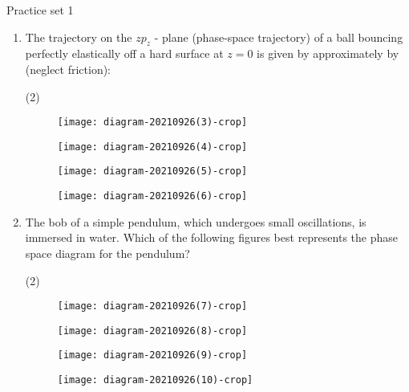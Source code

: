 \newpage
\begin{abox}
	Practice set 1 
\end{abox}
\begin{enumerate}
	\item The trajectory on the $z p_{z}$ - plane (phase-space trajectory) of a ball bouncing perfectly elastically off a hard surface at $z=0$ is given by approximately by (neglect friction):
	{}
	\begin{tasks}(2)
		\task[\textbf{A.}]\begin{figure}[H]
			\centering
			\texttt{[image: diagram-20210926(3)-crop]}
		\end{figure}
		\task[\textbf{B.}]\begin{figure}[H]
			\centering
			\texttt{[image: diagram-20210926(4)-crop]}
		\end{figure}
		\task[\textbf{C.}]\begin{figure}[H]
			\centering
			\texttt{[image: diagram-20210926(5)-crop]}
		\end{figure}
		\task[\textbf{D.}]\begin{figure}[H]
			\centering
			\texttt{[image: diagram-20210926(6)-crop]}
		\end{figure}
	\end{tasks}
	\item The bob of a simple pendulum, which undergoes small oscillations, is immersed in water. Which of the following figures best represents the phase space diagram for the pendulum?
	{}
	\begin{tasks}(2)
		\task[\textbf{A.}]\begin{figure}[H]
			\centering
			\texttt{[image: diagram-20210926(7)-crop]}
		\end{figure}
		\task[\textbf{B.}]\begin{figure}[H]
			\centering
			\texttt{[image: diagram-20210926(8)-crop]}
		\end{figure}
		\task[\textbf{C.}]\begin{figure}[H]
			\centering
			\texttt{[image: diagram-20210926(9)-crop]}
		\end{figure}
		\task[\textbf{D.}]\begin{figure}[H]
			\centering
			\texttt{[image: diagram-20210926(10)-crop]}
		\end{figure}
	\end{tasks}

\end{enumerate}
